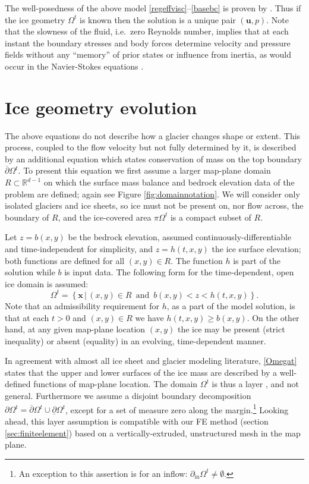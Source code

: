\documentclass[letterpaper,final,12pt,reqno]{amsart}
\newcommand{\RR}{\mathbb{R}}
\newcommand{\bu}{\mathbf{u}}
\newcommand{\bx}{\mathbf{x}}
\begin{document}
The well-posedness of the above model \eqref{regeffvisc}--\eqref{basebc} is proven by \cite{JouvetRappaz2011}.  Thus if the ice geometry $\Omega^t$ is known then the solution is a unique pair $(\bu,p)$.  Note that the slowness of the fluid, i.e.~zero Reynolds number, implies that at each instant the boundary stresses and body forces determine velocity and pressure fields without any ``memory'' of prior states or influence from inertia, as would occur in the Navier-Stokes equations \cite{Fowler1997}.


\section{Ice geometry evolution} \label{sec:stronggeometry}

The above equations do not describe how a glacier changes shape or extent.  This process, coupled to the flow velocity but not fully determined by it, is described by an additional equation which states conservation of mass on the top boundary $\overline{\partial} \Omega^t$.  To present this equation we first assume a larger map-plane domain $R\subset \RR^{d-1}$ on which the surface mass balance and bedrock elevation data of the problem are defined; again see Figure \ref{fig:domainnotation}.  We will consider only isolated glaciers and ice sheets, so ice must not be present on, nor flow across, the boundary of $R$, and the ice-covered area $\pi\Omega^t$ is a compact subset of $R$.

Let $z=b(x,y)$ be the bedrock elevation, assumed continuously-differentiable and time-independent for simplicity, and $z=h(t,x,y)$ the ice surface elevation; both functions are defined for all $(x,y)\in R$.  The function $h$ is part of the solution while $b$ is input data.  The following form for the time-dependent, open ice domain is assumed:
\begin{equation}
\Omega^t = \left\{\bx\,\big|\,(x,y)\in R \,\text{ and }\, b(x,y) < z < h(t,x,y)\right\}.  \label{Omegat}
\end{equation}
Note that an admissibility requirement for $h$, as a part of the model solution, is that at each $t>0$ and $(x,y)\in R$ we have $h(t,x,y) \ge b(x,y)$.  On the other hand, at any given map-plane location $(x,y)$ the ice may be present (strict inequality) or absent (equality) in an evolving, time-dependent manner.

In agreement with almost all ice sheet and glacier modeling literature, \eqref{Omegat} states that the upper and lower surfaces of the ice mass are described by a well-defined functions of map-plane location.  The domain $\Omega^t$ is thus a layer \cite{Bueler2020}, and not general.  Furthermore we assume a disjoint boundary decomposition $\partial \Omega^t = \overline{\partial} \Omega^t \cup \underline{\partial} \Omega^t$, except for a set of measure zero along the margin.\footnote{An exception to this assertion is for an inflow: $\partial_{\text{in}} \Omega^t \ne \emptyset$.}  Looking ahead, this layer assumption is compatible with our FE method (section \ref{sec:finiteelement}) based on a vertically-extruded, unstructured mesh in the map plane.
\end{document}
